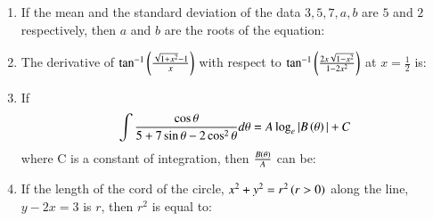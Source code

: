 \documentclass[journal,12pt,onecolumn]{IEEEtran}
\theoremstyle{remark}
\begin{document}
\begin{enumerate}
\begin{enumerate}
\begin{multicols}{4}
\end{multicols}
     \end{enumerate}
     \item If the mean and the standard deviation of the data $3,5,7,a,b$ are $5$ and $2$ respectively, then $a$ and $b$ are the roots of the equation:
     \begin{enumerate}
     \end{enumerate}
     \item The derivative of $\tan^{-1}\left(\frac{\sqrt{1+x^{2}}-1}{x}\right)$ with respect to $\tan^{-1}\left(\frac{2x\sqrt{1-x^{2}}}{1-2x^{2}}\right)$ at $x=\frac{1}{2}$ is:
     \begin{enumerate}
      \end{enumerate}
      \item If 
	      \begin{align}
		      \int \frac{\cos\theta}{5+7\sin\theta-2\cos^{2}\theta}d\theta= A\log_{e}|B\left(\theta\right)|+C
	      \end{align}
	      where C is a constant of integration, then $\frac{B\left(\theta\right)}{A}$ can be:
      \begin{enumerate}
      \end{enumerate}
      \item If the length of the cord of the circle, $x^{2}+y^{2}=r^{2}\left(r>0\right)$ along the line, $y-2x=3$ is $r$, then $r^{2}$ is equal to:

\end{enumerate}
\end{document}
